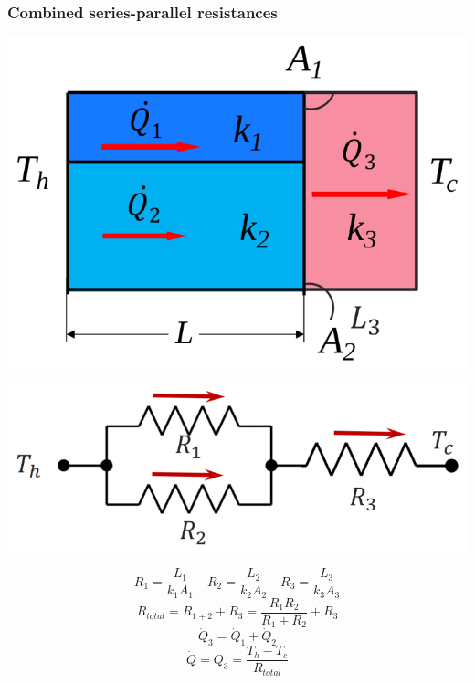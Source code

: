\documentclass[11pt]{article}
\begin{document}
\subsubsection{Combined series-parallel resistances}
\label{sec:orga6af07e}
\begin{center}
\includegraphics[width=.9\linewidth]{./images/thermal-resistances-combined.png}
\end{center}
\begin{center}
\includegraphics[width=.9\linewidth]{./images/thermal-resistances-combined-electrical-analogy.png}
\end{center}
\[R_1 = \frac{L_1}{k_1 A_1} \quad R_2 = \frac{L_2}{k_2 A_2} \quad R_3 = \frac{L_3}{k_3 A_3}\]
\[R_{total} = R_{1 + 2} + R_3 = \frac{R_1 R_2}{R_1 + R_2} + R_3\]
\[\dot{Q}_3 = \dot{Q}_1 + \dot{Q}_2\]
\[\dot{Q} = \dot{Q}_3 = \frac{T_h - T_c}{R_{total}}\]
\end{document}

